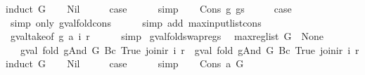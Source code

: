 \begin{isabellebody}
%
\isadelimproof
%
\endisadelimproof
%
\isatagproof
{}\isamarkupfalse%
{\isacharparenleft}induct\ G{\isacharparenright}\isanewline
\ \ \isamarkupfalse%
\ Nil\isanewline
\ \ \isamarkupfalse%
\ \isamarkupfalse%
\ {\isacharquery}case\isanewline
\ \ \ \ \isamarkupfalse%
\ simp\isanewline
{}\isamarkupfalse%
\isanewline
\ \ \isamarkupfalse%
\ {\isacharparenleft}Cons\ g\ gs{\isacharparenright}\isanewline
\ \ \isamarkupfalse%
\ \isamarkupfalse%
\ {\isacharquery}case\isanewline
\ \ \ \ \isamarkupfalse%
\ {\isacharparenleft}simp\ only{\isacharcolon}\ gval{\isacharunderscore}fold{\isacharunderscore}cons{\isacharparenright}\isanewline
\ \ \ \ \isamarkupfalse%
\ {\isacharparenleft}simp\ add{\isacharcolon}\ max{\isacharunderscore}input{\isacharunderscore}list{\isacharunderscore}cons{\isacharparenright}\isanewline
\ \ \ \ \isamarkupfalse%
\ gval{\isacharunderscore}take{\isacharbrackleft}of\ g\ a\ i\ r{\isacharbrackright}\isanewline
\ \ \ \ \isamarkupfalse%
\ simp\isanewline
{}\isamarkupfalse%
%
\endisatagproof
{\isafoldproof}%
%
\isadelimproof
\isanewline
%
\endisadelimproof
\isanewline
{}\isamarkupfalse%
\ gval{\isacharunderscore}fold{\isacharunderscore}swap{\isacharunderscore}regs{\isacharcolon}\isanewline
\ \ {\isachardoublequoteopen}max{\isacharunderscore}reg{\isacharunderscore}list\ G\ {\isacharequal}\ None\ {\isasymLongrightarrow}\isanewline
\ \ \ gval\ {\isacharparenleft}fold\ gAnd\ G\ {\isacharparenleft}Bc\ True{\isacharparenright}{\isacharparenright}\ {\isacharparenleft}join{\isacharunderscore}ir\ i\ r{\isacharparenright}\ {\isacharequal}\ gval\ {\isacharparenleft}fold\ gAnd\ G\ {\isacharparenleft}Bc\ True{\isacharparenright}{\isacharparenright}\ {\isacharparenleft}join{\isacharunderscore}ir\ i\ r{\isacharprime}{\isacharparenright}{\isachardoublequoteclose}\isanewline
%
\isadelimproof
%
\endisadelimproof
%
\isatagproof
{}\isamarkupfalse%
{\isacharparenleft}induct\ G{\isacharparenright}\isanewline
\ \ \isamarkupfalse%
\ Nil\isanewline
\ \ \isamarkupfalse%
\ \isamarkupfalse%
\ {\isacharquery}case\isanewline
\ \ \ \ \isamarkupfalse%
\ simp\isanewline
{}\isamarkupfalse%
\isanewline
\ \ \isamarkupfalse%
\ {\isacharparenleft}Cons\ a\ G{\isacharparenright}\isanewline
\ \ \isamarkupfalse%
\ \isamarkupfalse%

\end{isabellebody}

